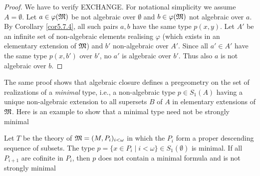 \documentclass[11pt]{article}
\begin{document}
\begin{proof}
We have to verify EXCHANGE.
For notational simplicity we assume \(A=\emptyset\).
Let \(a\in\varphi(\mathfrak{M})\) be not algebraic over \(\emptyset\) and \(b\in\varphi(\mathfrak{M})\) not algebraic over \(a\).
By Corollary \ref{cor5.7.4}, all such pairs \(a,b\) have the same type \(p(x,y)\). Let \(A'\) be
an infinite set of non-algebraic elements realising \(\varphi\) (which exists in an elementary extension
of \(\mathfrak{M}\))
and \(b'\) non-algebraic over \(A'\).
Since all \(a'\in A'\) have the same
type \(p(x,b')\) over \(b'\), no \(a'\) is algebraic over \(b'\).
Thus also \(a\) is not
algebraic over \(b\).
\end{proof}

The same proof shows that algebraic closure defines a pregeometry on the set of realizations of
a \emph{minimal} type, i.e., a non-algebraic type \(p\in S_1(A)\) having a unique non-algebraic extension
to all supersets \(B\) of \(A\) in elementary extensions of \(\mathfrak{M}\). Here is an example to show
that a minimal type need not be strongly minimal

Let \(T\) be the theory of \(\mathfrak{M}=(M,P_i)_{i<\omega}\) in which the \(P_i\) form a proper descending
sequence of subsets. The type \(p=\{x\in P_i\mid i<\omega\}\in S_1(\emptyset)\) is minimal. If all \(P_{i+1}\) are
cofinite in \(P_i\), then \(p\) does not contain a minimal formula and is not strongly minimal
\end{document}
